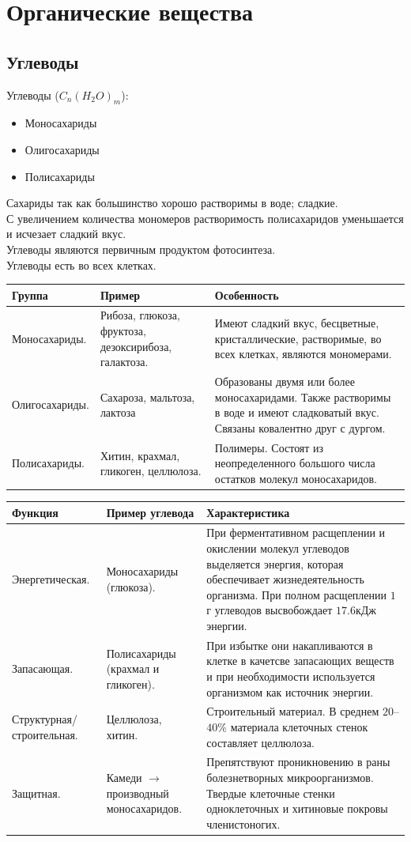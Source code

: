 \documentclass[12pt]{article}
\begin{document}
	\section{Органические вещества}
	\subsection{Углеводы}
	Углеводы ($C_n(H_2O)_m$):
	\begin{itemize}
		\item Моносахариды
		\item Олигосахариды
		\item Полисахариды
	\end{itemize}
	Сахариды так как большинство хорошо растворимы в воде; сладкие.\\
	С увеличением количества мономеров растворимость полисахаридов уменьшается и исчезает сладкий вкус.\\
	Углеводы являются первичным продуктом фотосинтеза.\\
	Углеводы есть во всех клетках.
	\begin{xltabular}{\textwidth}{|X|X|X|}
		\hline
		Группа & Пример & Особенность\\
		\hline
		Моносахариды. & Рибоза, глюкоза, фруктоза, дезоксирибоза, галактоза. & Имеют сладкий вкус, бесцветные, кристаллические, растворимые, во всех клетках, являются мономерами.\\
		\hline
		Олигосахариды. & Сахароза, мальтоза, лактоза & Образованы двумя или более моносахаридами. Также растворимы в воде и имеют сладковатый вкус. Связаны ковалентно друг с дургом.\\
		\hline
		Полисахариды. & Хитин, крахмал, гликоген, целлюлоза. & Полимеры. Состоят из неопределенного большого числа остатков молекул моносахаридов.\\
		\hline
	\end{xltabular}
	\begin{xltabular}{\textwidth}{|X|X|X|}
		\hline
		Функция & Пример углевода & Характеристика\\
		\hline
		Энергетическая. & Моносахариды (глюкоза). & При ферментативном расщеплении и окислении молекул углеводов выделяется энергия, которая обеспечивает жизнедеятельность организма. При полном расщеплении $1$г углеводов высвобождает $17.6$кДж энергии.\\
		\hline
		Запасающая. & Полисахариды (крахмал и гликоген). & При избытке они накапливаются в клетке в качетсве запасающих веществ и при необходимости используется организмом как источник энергии.\\
		\hline
		Структурная/строительная. & Целлюлоза, хитин. & Строительный материал. В среднем $20$--$40\%$ материала клеточных стенок составляет целлюлоза.\\
		\hline
		Защитная. & Камеди $\rightarrow$ производный моносахаридов. & Препятствуют проникновению в раны болезнетворных микроорганизмов. Твердые клеточные стенки одноклеточных и хитиновые покровы членистоногих.\\
		\hline
	\end{xltabular}
\end{document}
